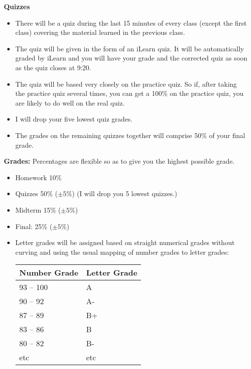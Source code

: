 \documentclass[oneside,12pt]{amsart}
\begin{document}
\bigskip

\textbf{Quizzes}
\begin{itemize}
\item There will be a quiz during the last 15 minutes of every class (except the first class) covering the material
learned in the previous class.
\item The quiz will be given in the form of an iLearn quiz. It will be automatically graded by iLearn and you will
have your grade and the corrected quiz as soon as the quiz closes at 9:20.
\item The quiz will be based very closely on the practice quiz. So if, after taking the practice quiz several times,
you can get a 100\% on the practice quiz, you are likely to do well on the real quiz.
\item I will drop your five lowest quiz grades.
\item The grades on the remaining quizzes together will comprise 50\% of your final grade.
\end{itemize}

\bigskip

\textbf{Grades:} Percentages are flexible so as to give you the highest possible grade.
\begin{itemize}
\item Homework 10\%
\item Quizzes  50\% ($\pm5\%$) (I will drop you 5 lowest quizzes.)
\item Midterm 15\% ($\pm5\%$)
\item Final: 25\% ($\pm5\%$)
\item Letter grades will be assigned based on straight numerical grades
without curving and using the usual mapping of number grades to letter grades:

\begin{center}
  \begin{tabular}{ | l | l |}
    \hline
    Number Grade & Letter Grade  \\ \hline \hline
    93 -- 100 & A\\ \hline
    90 -- 92 & A- \\ \hline
    87 -- 89 & B+ \\ \hline
    83 -- 86 & B \\ \hline
    80 -- 82 & B- \\ \hline
    etc & etc \\ \hline
  \end{tabular}
\end{center}

\end{itemize}
\end{document}
